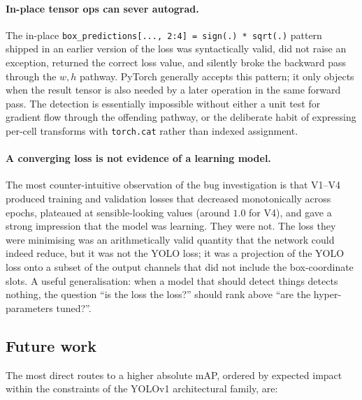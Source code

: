 \paragraph{In-place tensor ops can sever autograd.} The in-place
\texttt{box\_predictions[..., 2:4] = sign(.) * sqrt(.)} pattern shipped in
an earlier version of the loss was syntactically valid, did not raise an
exception, returned the correct loss value, and silently broke the backward
pass through the $w, h$ pathway. PyTorch generally accepts this pattern;
it only objects when the result tensor is also needed by a later operation
in the same forward pass. The detection is essentially impossible without
either a unit test for gradient flow through the offending pathway, or the
deliberate habit of expressing per-cell transforms with \texttt{torch.cat}
rather than indexed assignment.

\paragraph{A converging loss is not evidence of a learning model.}
The most counter-intuitive observation of the bug investigation is that
V1--V4 produced training and validation losses that decreased monotonically
across epochs, plateaued at sensible-looking values (around $1.0$ for V4),
and gave a strong impression that the model was learning. They were not.
The loss they were minimising was an arithmetically valid quantity that the
network could indeed reduce, but it was not the YOLO loss; it was a
projection of the YOLO loss onto a subset of the output channels that did
not include the box-coordinate slots. A useful generalisation: when a model
that should detect things detects nothing, the question
``is the loss the loss?'' should rank above
``are the hyper-parameters tuned?''.

\subsection{Future work}
\label{sec:disc:future}

The most direct routes to a higher absolute mAP, ordered by expected impact
within the constraints of the YOLOv1 architectural family, are:

